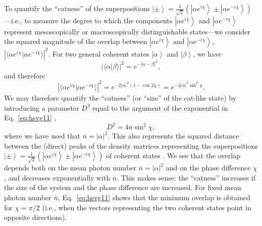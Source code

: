 \documentclass[3p,sort&compress]{elsarticle}
\newcommand{\ket}[1]{\left\vert{#1}\right\rangle}
\newcommand{\braket}[2]{\ensuremath{{\langle #1}|{#2 \rangle}}}
\providecommand{\abs}[1]{\left\lvert#1\right\rvert}
\newcommand{\E}{\ensuremath{e}}
\newcommand{\I}{\ensuremath{i}}
\begin{document}
To quantify the ``catness'' of the superpositions $\ket{\pm} =\frac{1}{\sqrt{2}} \left(\ket{\alpha \E^{\I \chi}}\pm \ket{\alpha \E^{-\I \chi}} \right)$---i.e., to measure the degree to which the components $\ket{\alpha \E^{\I \chi}}$ and $\ket{\alpha \E^{-\I \chi}}$ represent mesoscopically or macroscopically distinguishable states---we consider the squared magnitude of the overlap between $\ket{\alpha \E^{\I \chi}}$ and $\ket{\alpha \E^{-\I \chi}}$, $\abs{\braket{\alpha \E^{\I \chi}}{\alpha \E^{-\I \chi}}}^2$. For two general coherent states $\ket{\alpha}$ and $\ket{\beta}$, we have
%
\begin{equation}\label{eq:hsvg}
\abs{\braket{\alpha}{\beta}}^2 = \E^{- \abs{\alpha-\beta}^2},
\end{equation}
%
and therefore
%
\begin{equation}\label{eq:hsvg11}
\abs{\braket{\alpha \E^{\I \chi}}{\alpha \E^{-\I \chi}}}^2 = \E^{- 2\abs{\alpha}^2(1-\cos2\chi)} =  \E^{- 4\abs{\alpha}^2\sin^2\chi}.
\end{equation}
%
We may therefore quantify the ``catness'' (or ``size'' of the cat-like state) by introducing a parameter $D^2$ equal to the argument of the exponential in Eq.~\eqref{eq:hsvg11} \cite{Brune:1996:om},
%
\begin{equation}\label{eq:hsADvg11}
D^2 = 4 \bar{n}\sin^2\chi,
\end{equation}
%
where we have used that $\bar{n}=\abs{\alpha}^2$. This also represents the squared distance between the (direct) peaks of the density matrices representing the superpositions $\ket{\pm} =\frac{1}{\sqrt{2}} \left(\ket{\alpha \E^{\I \chi}}\pm \ket{\alpha \E^{-\I \chi}} \right)$ of coherent states \cite{Deleglise:2008:oo}. We see that the overlap depends both on the mean photon number $\bar{n}=\abs{\alpha}^2$ and on the phase difference $\chi$, and decreases exponentially with $\bar{n}$. This makes sense: the ``catness'' increases if the size of the system and the phase difference are increased. For fixed mean photon number $\bar{n}$, Eq.~\eqref{eq:hsvg11} shows that the minimum overlap is obtained for $\chi=\pi/2$ (i.e., when the vectors representing the two coherent states point in opposite directions). 
\end{document}
